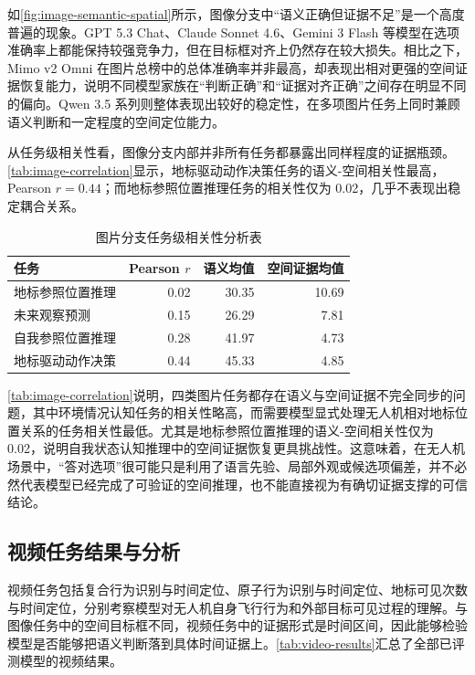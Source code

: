 如\autoref{fig:image-semantic-spatial}所示，图像分支中“语义正确但证据不足”是一个高度普遍的现象。GPT 5.3 Chat、Claude Sonnet 4.6、Gemini 3 Flash 等模型在选项准确率上都能保持较强竞争力，但在目标框对齐上仍然存在较大损失。相比之下，Mimo v2 Omni 在图片总榜中的总体准确率并非最高，却表现出相对更强的空间证据恢复能力，说明不同模型家族在“判断正确”和“证据对齐正确”之间存在明显不同的偏向。Qwen 3.5 系列则整体表现出较好的稳定性，在多项图片任务上同时兼顾语义判断和一定程度的空间定位能力。

从任务级相关性看，图像分支内部并非所有任务都暴露出同样程度的证据瓶颈。\autoref{tab:image-correlation}显示，地标驱动动作决策任务的语义-空间相关性最高，Pearson \(r=0.44\)；而地标参照位置推理任务的相关性仅为 0.02，几乎不表现出稳定耦合关系。

\begin{table}[htbp]
    \centering
    \caption{图片分支任务级相关性分析表}
    \label{tab:image-correlation}
    \begin{tabularx}{\textwidth}{Xrrr}
        \toprule
        任务 & Pearson \(r\) & 语义均值 & 空间证据均值 \\
        \midrule
        地标参照位置推理 & 0.02 & 30.35 & 10.69 \\
        未来观察预测 & 0.15 & 26.29 & 7.81 \\
        自我参照位置推理 & 0.28 & 41.97 & 4.73 \\
        地标驱动动作决策 & 0.44 & 45.33 & 4.85 \\
        \bottomrule
    \end{tabularx}
\end{table}

\autoref{tab:image-correlation}说明，四类图片任务都存在语义与空间证据不完全同步的问题，其中环境情况认知任务的相关性略高，而需要模型显式处理无人机相对地标位置关系的任务相关性最低。尤其是地标参照位置推理的语义-空间相关性仅为 0.02，说明自我状态认知推理中的空间证据恢复更具挑战性。这意味着，在无人机场景中，“答对选项”很可能只是利用了语言先验、局部外观或候选项偏差，并不必然代表模型已经完成了可验证的空间推理，也不能直接视为有确切证据支撑的可信结论。

\FloatBarrier
\subsection{视频任务结果与分析}

视频任务包括复合行为识别与时间定位、原子行为识别与时间定位、地标可见次数与时间定位，分别考察模型对无人机自身飞行行为和外部目标可见过程的理解。与图像任务中的空间目标框不同，视频任务中的证据形式是时间区间，因此能够检验模型是否能够把语义判断落到具体时间证据上。\autoref{tab:video-results}汇总了全部已评测模型的视频结果。

